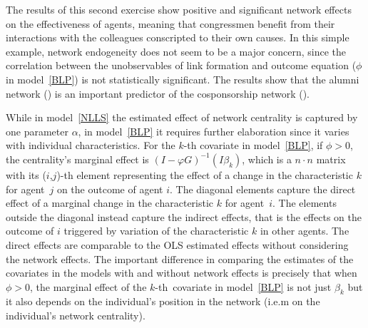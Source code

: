 \documentclass[nojss]{jss}
\begin{document}
The results of this second exercise show positive and significant network effects on the effectiveness of agents, meaning that congressmen benefit from their interactions with the colleagues conscripted to their own causes. In this simple example, network endogeneity does not seem to be a major concern, since the correlation between the unobservables of link formation and outcome equation ($\phi$ in model~\ref{BLP}) is not statistically significant. The results show that the alumni network () is an important predictor of the cosponsorship network ().

While in model~\ref{NLLS} the estimated effect of network centrality is captured by one parameter $\alpha$, in model~\ref{BLP} it requires further elaboration since it varies with individual characteristics. For the $k$-th covariate in model~\ref{BLP}, if $\phi >0$, the centrality's marginal effect is $(I-\varphi G)^{-1}(I\beta _{k})$, which is a $n\cdot n$ matrix with its ($i$,$j$)-th element representing the effect of a change in the characteristic $k$ for agent $\,j$ on the outcome
of agent $i.$ The diagonal elements capture the direct effect of a marginal change in the characteristic $k$ for agent $\,i.$ The elements outside the diagonal instead capture the indirect effects, that is the effects on the outcome of $i$ triggered by variation of the characteristic $k$ in other agents. The direct effects are comparable to the OLS estimated effects without considering the network effects. The important difference in comparing the estimates of the covariates in the models with
and without network effects is precisely that when $\phi>0$, the marginal effect of the $k$-th\ covariate in model~\ref{BLP} is not just $\beta_{k}$ but it also depends on the individual's position in the network (i.e.m on the individual's network centrality).
\end{document}

